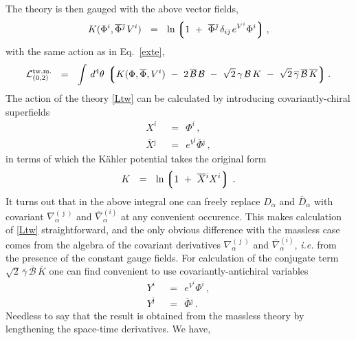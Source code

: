 \documentclass[12pt]{article}
\def\beq{\begin{equation}}
\def\eeq{\end{equation}}
\newcommand{\ov}{\overline}
\newcommand{\mc}[1]{\mathcal{#1}}
\newcommand{\lgr}{\left\lgroup}
\newcommand{\rgr}{\right\rgroup}
\newcommand{\bj}{{\bar \jmath}}
\begin{document}
	The theory is then gauged with the above vector fields,
\[
	K(\Phi^i, \ov{\Phi}{}^\bj\, V^i) ~~=~~
		\ln \lgr 1 ~+~ \ov{\Phi}{}^\bj\, \delta_{i\bj}\, e^{V^i} \Phi^i \rgr ,
\]	
	with the same action as in Eq.~\eqref{exte},
\beq
\label{Ltw}
	\mc{L}_{(0,2)}^\text{tw.m.} ~~=~~ \int\, d^4\theta\, \lgr K(\Phi,\ov{\Phi}, V^i) 
		~-~ 2\, \ov{\mc{B}}\,\mc{B}  
		~-~  \sqrt{2}\, \gamma\,\mc{B}\,K  ~-~ \sqrt{2}\, \ov{\gamma}\,\ov{\mc{B}}\,\ov{K} \rgr.
\eeq
	The action of the theory \eqref{Ltw} can be calculated by introducing covariantly-chiral superfields
\begin{align*}
%
	X^i & ~~=~~ \Phi^i\,, \\
%
	\ov{X}{}^\bj & ~~=~~ e^{V^\bj} \ov{\Phi}{}^\bj\,,
\end{align*}
	in terms of which the K\"{a}hler potential takes the original form
\[
	K ~~=~~ \ln \lgr 1 ~+~ \ov{X}{}^i X^i \rgr\,.
\]
	It turns out that in the above integral one can freely replace $ D_\alpha $ and $ \ov{D}{}_\alpha $ with
	covariant $ \nabla^{(\bj)}_\alpha $ and $ \ov{\nabla}{}^{(i)}_\alpha $ at any convenient occurence.
	This makes calculation of \eqref{Ltw} straightforward, and the only obvious difference with the massless
	case comes from the algebra of the covariant derivatives $ \nabla^{(\bj)}_\alpha $ and 
	$ \ov{\nabla}{}^{(i)}_\alpha $, {\it i.e.} from the presence of the constant gauge fields.
	For calculation of the conjugate term $ \sqrt{2}\, \ov{\gamma}\,\ov{\mc{B}}\,\ov{K} $ one can find convenient to 
	use covariantly-antichiral variables
\begin{align*}
%
	Y^i & ~~=~~ e^{V^i} \Phi^i\,, \\
%
	Y^\bj & ~~=~~ \ov{\Phi}{}^\bj\,.
\end{align*}
	Needless to say that the result is obtained from the massless theory by lengthening the space-time derivatives.
	We have,
\end{document}
